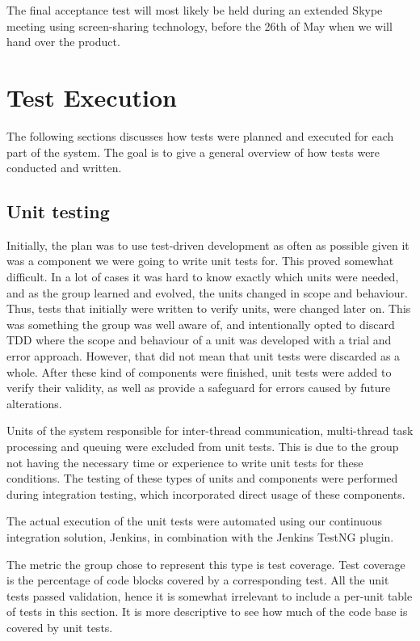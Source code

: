 The final acceptance test will most likely be held during an extended Skype meeting using screen-sharing technology, before the 26th of May when we will hand over the product.

\section{Test Execution}
\label{subsec:testing-test_execution}

The following sections discusses how tests were planned and executed for each part of the system. The goal is to give a general overview of how tests were conducted and written.

\subsection{Unit testing}
\label{subsec:testing-test_execution-unit_testing}

Initially, the plan was to use test-driven development as often as possible given it was a component we were going to write unit tests for. This proved somewhat difficult. In a lot of cases it was hard to know exactly which units were needed, and as the group learned and evolved, the units changed in scope and behaviour. Thus, tests that initially were written to verify units, were changed later on. This was something the group was well aware of, and intentionally opted to discard TDD where the scope and behaviour of a unit was developed with a trial and error approach. However, that did not mean that unit tests were discarded as a whole. After these kind of components were finished, unit tests were added to verify their validity, as well as provide a safeguard for errors caused by future alterations.

Units of the system responsible for inter-thread communication, multi-thread task processing and queuing were excluded from unit tests. This is due to the group not having the necessary time or experience to write unit tests for these conditions. The testing of these types of units and components were performed during integration testing, which incorporated direct usage of these components.

The actual execution of the unit tests were automated using our continuous integration solution, Jenkins, in combination with the Jenkins TestNG plugin.

The metric the group chose to represent this type is test coverage. Test coverage is the percentage of code blocks covered by a corresponding test. All the unit tests passed validation, hence it is somewhat irrelevant to include a per-unit table of tests in this section. It is more descriptive to see how much of the code base is covered by unit tests.

